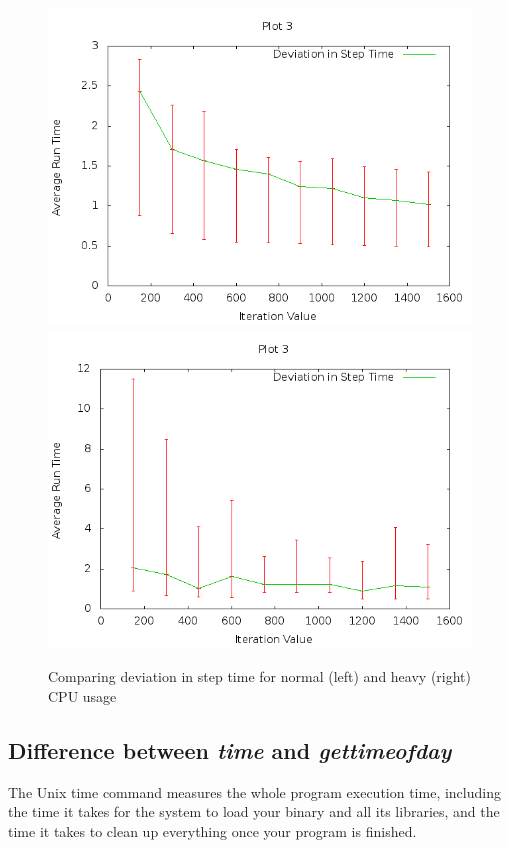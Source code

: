 \documentclass[11pt]{article}
\begin{document}
\begin{figure}[h]
\centering
\includegraphics[scale=0.27]{g19_plot03.png}
\includegraphics[scale=0.27]{heavy_plot03.png}
\caption{Comparing deviation in step time for normal (left) and heavy (right) CPU usage}
\end{figure}
\subsection{Difference between \textit{time} and \textit{gettimeofday}}
The Unix time command measures the whole program execution time, including the time it takes for the system to load your binary and all its libraries, and the time it takes to clean up everything once your program is finished.
\end{document}
